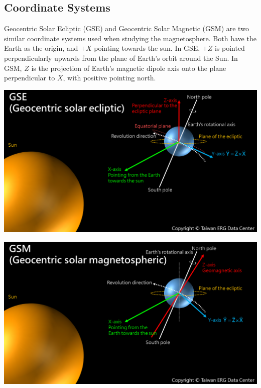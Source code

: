 \documentclass[12pt]{article}
\newenvironment{Figure}
  {\par\medskip\noindent\minipage{\linewidth}}
  {\endminipage\par\medskip}
\begin{document}
\subsection{Coordinate Systems}
Geocentric Solar Ecliptic (GSE) and Geocentric Solar Magnetic (GSM) are two similar coordinate systems used when studying the magnetosphere. Both have the Earth as the origin, and $+X$ pointing towards the sun. In GSE, $+Z$ is pointed perpendicularly upwards from the plane of Earth's orbit around the Sun. In GSM, $Z$ is the projection of Earth's magnetic dipole axis onto the plane perpendicular to $X$, with positive pointing north.

\begin{Figure}
    \begin{minipage}[c]{0.48\textwidth}
        \centering
        \includegraphics[width=\textwidth]{GSE.png}
    \end{minipage}
    \begin{minipage}[c]{0.48\textwidth}
        \centering
        \includegraphics[width=\textwidth]{GSM.png}
    \end{minipage}
\end{Figure}
\end{document}
